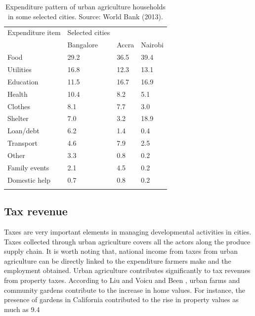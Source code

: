 \begin{table}[th]
\caption{Expenditure pattern of urban agriculture households in some selected cities. Source: World Bank (2013).}
\begin{center}
\begin{tabular}{ p{} p{} p{} p{} } 
\hline
Expenditure item & Selected cities &  &  \\
  & Bangalore & Accra & Nairobi \\
\hline
Food & 29.2 & 36.5 & 39.4 \\
Utilities & 16.8 & 12.3 & 13.1 \\
Education & 11.5 & 16.7 & 16.9 \\
Health & 10.4 & 8.2 & 5.1 \\
Clothes & 8.1 & 7.7 & 3.0 \\
Shelter & 7.0 & 3.2 & 18.9 \\
Loan/debt & 6.2 & 1.4 & 0.4 \\
Transport & 4.6 & 7.9 & 2.5 \\
Other & 3.3 & 0.8 & 0.2 \\
Family events & 2.1 & 4.5 & 0.2 \\
Domestic help & 0.7 & 0.8 & 0.2 \\
\hline
\label{tbl:expenditurePattern}
\end{tabular}
\end{center}
\end{table}

\subsection{Tax revenue}

Taxes are very important elements in managing developmental activities in cities. Taxes collected through urban agriculture covers all the actors along the produce supply chain. It is worth noting that, national income from taxes from urban agriculture can be directly linked to the expenditure farmers make and the employment obtained. Urban agriculture contributes significantly to tax revenues from property taxes. According to Liu \cite{RIZWAN2008} and Voicu and Been \cite{Voicu2008}, urban farms and community gardens contribute to the increase in home values. For instance, the presence of gardens in California contributed to the rise in property values as much as 9.4%

